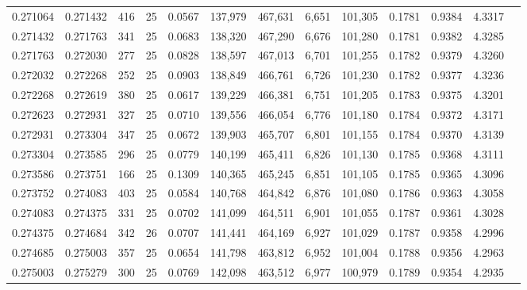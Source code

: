 \begin{tabular}{rrrrrrrrrrrrr}
0.271064 & 0.271432 &   416 &  25 &                                     0.0567 & 137,979 & 467,631 &   6,651 & 101,305 & 0.1781 & 0.9384 & 4.3317 \\
0.271432 & 0.271763 &   341 &  25 &                                     0.0683 & 138,320 & 467,290 &   6,676 & 101,280 & 0.1781 & 0.9382 & 4.3285 \\
0.271763 & 0.272030 &   277 &  25 &                                     0.0828 & 138,597 & 467,013 &   6,701 & 101,255 & 0.1782 & 0.9379 & 4.3260 \\
0.272032 & 0.272268 &   252 &  25 &                                     0.0903 & 138,849 & 466,761 &   6,726 & 101,230 & 0.1782 & 0.9377 & 4.3236 \\
0.272268 & 0.272619 &   380 &  25 &                                     0.0617 & 139,229 & 466,381 &   6,751 & 101,205 & 0.1783 & 0.9375 & 4.3201 \\
0.272623 & 0.272931 &   327 &  25 &                                     0.0710 & 139,556 & 466,054 &   6,776 & 101,180 & 0.1784 & 0.9372 & 4.3171 \\
0.272931 & 0.273304 &   347 &  25 &                                     0.0672 & 139,903 & 465,707 &   6,801 & 101,155 & 0.1784 & 0.9370 & 4.3139 \\
0.273304 & 0.273585 &   296 &  25 &                                     0.0779 & 140,199 & 465,411 &   6,826 & 101,130 & 0.1785 & 0.9368 & 4.3111 \\
0.273586 & 0.273751 &   166 &  25 &                                     0.1309 & 140,365 & 465,245 &   6,851 & 101,105 & 0.1785 & 0.9365 & 4.3096 \\
0.273752 & 0.274083 &   403 &  25 &                                     0.0584 & 140,768 & 464,842 &   6,876 & 101,080 & 0.1786 & 0.9363 & 4.3058 \\
0.274083 & 0.274375 &   331 &  25 &                                     0.0702 & 141,099 & 464,511 &   6,901 & 101,055 & 0.1787 & 0.9361 & 4.3028 \\
0.274375 & 0.274684 &   342 &  26 &                                     0.0707 & 141,441 & 464,169 &   6,927 & 101,029 & 0.1787 & 0.9358 & 4.2996 \\
0.274685 & 0.275003 &   357 &  25 &                                     0.0654 & 141,798 & 463,812 &   6,952 & 101,004 & 0.1788 & 0.9356 & 4.2963 \\
0.275003 & 0.275279 &   300 &  25 &                                     0.0769 & 142,098 & 463,512 &   6,977 & 100,979 & 0.1789 & 0.9354 & 4.2935 \\

\end{tabular}
